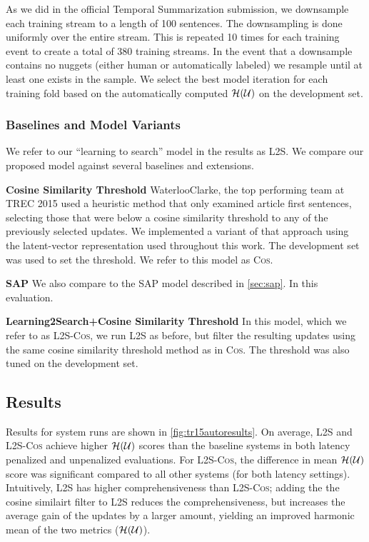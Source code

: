 As we did in the official Temporal Summarization submission,  we  downsample
each training stream to a length of 100 sentences. The downsampling is done
uniformly over the entire stream. This is repeated 10 times for each training
event to create a total of 380 training streams. In the event that a downsample
contains no nuggets (either human or automatically labeled) we resample until
at least one exists in the sample.  We select the best model iteration for each
training fold based on the automatically computed $\mathcal{H}(\mathcal{U})$
on the development set.

\subsubsection{Baselines and Model Variants}

We refer to our ``learning to search'' model in the results as \textsc{L2S}.
We compare our proposed model against several baselines and extensions. 

\textbf{Cosine Similarity Threshold} WaterlooClarke, the top performing team at
TREC 2015 used a heuristic method that only examined article first sentences,
selecting those that were below a cosine similarity threshold to any of the
previously selected updates. We implemented a variant of that approach using
the latent-vector representation used throughout this work. The development set
was used to set the threshold. We refer to this model as \textsc{Cos}.
  
\textbf{SAP} We also compare to the SAP model described in \autoref{sec:sap}.
In this evaluation.

\textbf{Learning2Search+Cosine Similarity Threshold} In this model, which we
refer to as \textsc{L2S-Cos}, we run \textsc{L2S} as before, but filter the
resulting updates using the same cosine similarity threshold method as in
\textsc{Cos}. The threshold was also tuned on the development set. 

\subsection{Results} \label{sec:results}

Results for system runs are shown in \autoref{fig:tr15autoresults}.  On
average, \textsc{L2S} and \textsc{L2S-Cos} achieve higher
$\mathcal{H}(\mathcal{U})$ scores than the baseline systems in both latency
penalized and unpenalized evaluations. For \textsc{L2S-Cos}, the difference in
mean $\mathcal{H}(\mathcal{U})$ score was significant compared to all other
systems (for both latency settings). Intuitively, L2S has higher
comprehensiveness than \textsc{L2S-Cos}; adding the the cosine similairt filter
to L2S reduces the comprehensiveness, but increases the average gain of the
updates by a larger amount, yielding an improved harmonic mean of the two
metrics ($\mathcal{H}(\mathcal{U})$).
 
